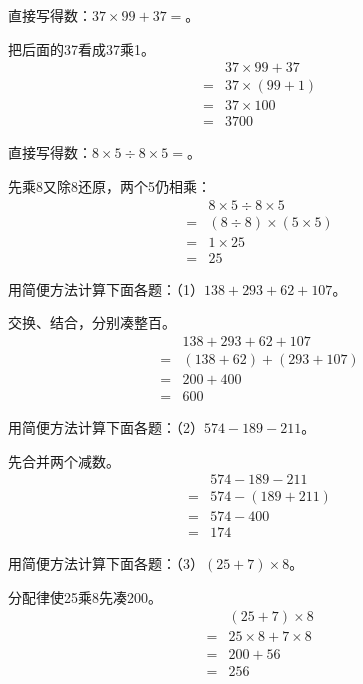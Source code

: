 直接写得数：\(37\times99+37=\)。\par
\begin{BookAnswer}
把后面的37看成37乘1。\[\begin{aligned} &37\times99+37\\={}&37\times(99+1)\\={}&37\times100\\={}&3700\end{aligned}\]
\end{BookAnswer}

直接写得数：\(8\times5\div8\times5=\)。\par
\begin{BookAnswer}
先乘8又除8还原，两个5仍相乘：\[\begin{aligned}&8\times5\div8\times5\\={}&(8\div8)\times(5\times5)\\={}&1\times25\\={}&25\end{aligned}\]
\end{BookAnswer}

用简便方法计算下面各题：（1）\(138+293+62+107\)。\par
\begin{BookAnswer}
交换、结合，分别凑整百。\[\begin{aligned} &138+293+62+107\\={}&(138+62)+(293+107)\\={}&200+400\\={}&600\end{aligned}\]
\end{BookAnswer}

用简便方法计算下面各题：（2）\(574-189-211\)。\par
\begin{BookAnswer}
先合并两个减数。\[\begin{aligned} &574-189-211\\={}&574-(189+211)\\={}&574-400\\={}&174\end{aligned}\]
\end{BookAnswer}

用简便方法计算下面各题：（3）\((25+7)\times8\)。\par
\begin{BookAnswer}
分配律使25乘8先凑200。\[\begin{aligned} &(25+7)\times8\\={}&25\times8+7\times8\\={}&200+56\\={}&256\end{aligned}\]
\end{BookAnswer}

